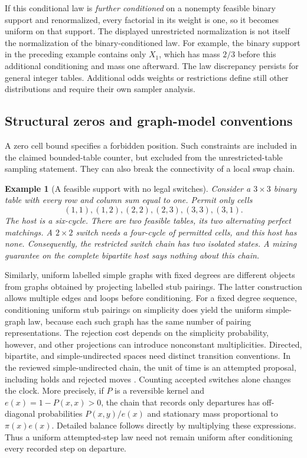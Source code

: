 \documentclass[11pt]{article}
\newtheorem{example}[proposition]{Example}
\begin{document}
If this conditional law is \emph{further conditioned} on a nonempty feasible binary support and renormalized, every factorial in its weight is one, so it becomes uniform on that support. The displayed unrestricted normalization is not itself the normalization of the binary-conditioned law. For example, the binary support in the preceding example contains only \(X_1\), which has mass \(2/3\) before this additional conditioning and mass one afterward. The law discrepancy persists for general integer tables. Additional odds weights or restrictions define still other distributions and require their own sampler analysis.

\subsection{Structural zeros and graph-model conventions}
A zero cell bound specifies a forbidden position. Such constraints are included in the claimed bounded-table counter, but excluded from the unrestricted-table sampling statement. They can also break the connectivity of a local swap chain.

\begin{example}[A feasible support with no legal switches]
Consider a \(3\times3\) binary table with every row and column sum equal to one. Permit only cells
\[
 (1,1),(1,2),(2,2),(2,3),(3,3),(3,1).
\]
The host is a six-cycle. There are two feasible tables, its two alternating perfect matchings. A \(2\times2\) switch needs a four-cycle of permitted cells, and this host has none. Consequently, the restricted switch chain has two isolated states. A mixing guarantee on the complete bipartite host says nothing about this chain.
\end{example}

Similarly, uniform labelled simple graphs with fixed degrees are different objects from graphs obtained by projecting labelled stub pairings. The latter construction allows multiple edges and loops before conditioning. For a fixed degree sequence, conditioning uniform stub pairings on simplicity does yield the uniform simple-graph law, because each such graph has the same number of pairing representations. The rejection cost depends on the simplicity probability, however, and other projections can introduce nonconstant multiplicities. Directed, bipartite, and simple-undirected spaces need distinct transition conventions. In the reviewed simple-undirected chain, the unit of time is an attempted proposal, including holds and rejected moves \cite{oaiSwitch}. Counting accepted switches alone changes the clock. More precisely, if \(P\) is a reversible kernel and \(e(x)=1-P(x,x)>0\), the chain that records only departures has off-diagonal probabilities \(P(x,y)/e(x)\) and stationary mass proportional to \(\pi(x)e(x)\). Detailed balance follows directly by multiplying these expressions. Thus a uniform attempted-step law need not remain uniform after conditioning every recorded step on departure.
\end{document}
